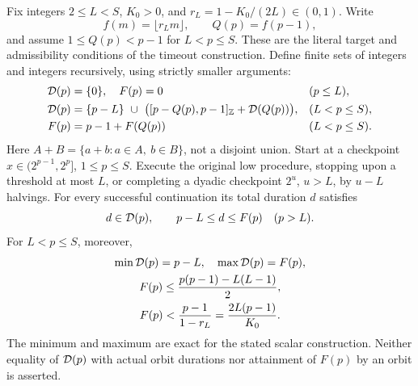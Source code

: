 \begin{proposition}
\label{prop:Shaik-low-schedule}
Fix integers \(2\le L<S\), \(K_0>0\), and
\(r_L=1-K_0/(2L)\in(0,1)\). Write
\[
 f(m)=\lfloor r_Lm\rfloor,\qquad Q(p)=f(p-1),
\]
and assume \(1\le Q(p)<p-1\) for \(L<p\le S\).
These are the literal target and admissibility conditions of the
timeout construction. Define finite sets of integers and integers
recursively, using strictly smaller arguments:
\begin{align}
 {\cal D}(p)&=\{0\},\quad F(p)=0 &&(p\le L), \notag\\
 {\cal D}(p)&=\{p-L\}\ \cup\
       \bigl([p-Q(p),p-1]_{\mathbb Z}+{\cal D}(Q(p))\bigr),
       &&(L<p\le S), \label{eq:Shaik-low-duration-set}\\
 F(p)&=p-1+F(Q(p)) &&(L<p\le S). \notag
\end{align}
Here \(A+B=\{a+b:a\in A,\ b\in B\}\), not a disjoint union.
Start at a checkpoint \(x\in(2^{p-1},2^p]\), \(1\le p\le S\). Execute the original
low procedure, stopping upon a threshold at most \(L\), or completing
a dyadic checkpoint \(2^u\), \(u>L\), by \(u-L\) halvings.
For every successful continuation its total duration \(d\) satisfies
\[
 d\in{\cal D}(p),\qquad p-L\le d\le F(p)\quad(p>L).
\]
For \(L<p\le S\), moreover,
\begin{equation}\label{eq:Shaik-low-budget}
 \begin{gathered}
 \min{\cal D}(p)=p-L,\quad\max{\cal D}(p)=F(p),\\
 F(p)\le\frac{p(p-1)-L(L-1)}2,\\
 F(p)<\frac{p-1}{1-r_L}=\frac{2L(p-1)}{K_0}.
 \end{gathered}
\end{equation}
The minimum and maximum are exact for the stated scalar construction.
Neither equality of \({\cal D}(p)\) with actual orbit durations nor
attainment of \(F(p)\) by an orbit is asserted.
\end{proposition}
